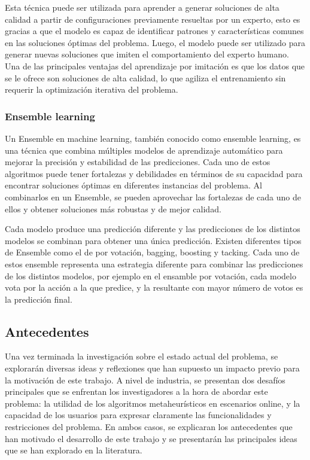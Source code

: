 Esta técnica puede ser utilizada para aprender a generar soluciones de alta
calidad a partir de configuraciones previamente resueltas por un experto, esto
es gracias a que el modelo es capaz de identificar patrones y características
comunes en las soluciones óptimas del problema. Luego, el modelo puede ser
utilizado para generar nuevas soluciones que imiten el comportamiento del
experto humano. Una de las principales ventajas del aprendizaje por imitación
es que los datos que se le ofrece son soluciones de alta calidad, lo que
agiliza el entrenamiento sin requerir la optimización iterativa del problema.

\subsubsection{Ensemble learning}
Un Ensemble\cite{Kundu_2023} en machine learning, también conocido como ensemble learning, es
una técnica que combina múltiples modelos de aprendizaje automático para
mejorar la precisión y estabilidad de las predicciones. Cada uno de estos
algoritmos puede tener fortalezas y debilidades en términos de su capacidad
para encontrar soluciones óptimas en diferentes instancias del problema. Al
combinarlos en un Ensemble, se pueden aprovechar las fortalezas de cada uno de
ellos y obtener soluciones más robustas y de mejor calidad.\medskip

Cada modelo produce una predicción diferente y las predicciones de los
distintos modelos se combinan para obtener una única predicción. Existen
diferentes tipos de Ensemble como el de por votación, bagging, boosting y
tacking\cite{Ensemble_Algorithms}. Cada uno de estos ensemble representa una 
estrategia diferente para combinar las predicciones de los distintos modelos, 
por ejemplo en el ensamble por votación, cada modelo vota por la acción a la 
que predice, y la resultante con mayor número de votos es la predicción final.

\subsection{Antecedentes}
Una vez terminada la investigación sobre el estado actual del problema, se
explorarán diversas ideas y reflexiones que han supuesto un impacto previo para
la motivación de este trabajo. A nivel de industria, se presentan dos
desafíos principales que se enfrentan los investigadores a la hora de abordar este problema:
la utilidad de los algoritmos metaheurísticos en escenarios online, y la
capacidad de los usuarios para expresar claramente las funcionalidades y
restricciones del problema. En ambos casos, se explicaran los antecedentes que
han motivado el desarrollo de este trabajo y se presentarán las principales
ideas que se han explorado en la literatura.\medskip

